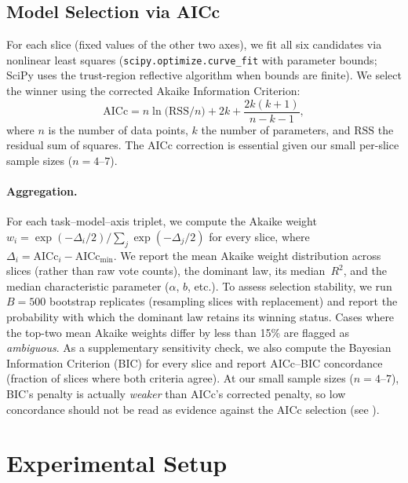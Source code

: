 \documentclass[11pt]{article}
\begin{document}
\subsection{Model Selection via AICc}

For each slice (fixed values of the other two axes), we fit all six
candidates via nonlinear least squares
(\texttt{scipy.optimize.curve\_fit} with parameter bounds;
SciPy uses the trust-region reflective algorithm when bounds are
finite). We select
the winner using the corrected Akaike Information Criterion:
\begin{equation}
  \mathrm{AICc} = n \ln\!\bigl(\mathrm{RSS}/n\bigr) + 2k +
  \frac{2k(k+1)}{n - k - 1},
\end{equation}
where $n$ is the number of data points, $k$ the number of parameters,
and $\mathrm{RSS}$ the residual sum of squares. The AICc correction
is essential given our small per-slice sample sizes ($n = 4$--$7$).

\paragraph{Aggregation.}
For each task--model--axis triplet, we compute the Akaike weight
$w_i = \exp(-\Delta_i/2)\big/\sum_j\exp(-\Delta_j/2)$
for every slice, where $\Delta_i = \mathrm{AICc}_i - \mathrm{AICc}_{\min}$.
We report the mean Akaike weight distribution across slices (rather
than raw vote counts), the dominant law, its median~$R^2$, and the
median characteristic parameter ($\alpha$, $b$, etc.).
To assess selection stability, we run $B=500$ bootstrap replicates
(resampling slices with replacement) and report the probability with
which the dominant law retains its winning status.
Cases where the top-two mean Akaike weights differ by less than 15\%
are flagged as \emph{ambiguous}.
As a supplementary sensitivity check, we also compute the Bayesian
Information Criterion (BIC) for every slice and report AICc--BIC
concordance (fraction of slices where both criteria agree).
At our small sample sizes ($n = 4$--$7$), BIC's penalty is actually
\emph{weaker} than AICc's corrected penalty, so low concordance
should not be read as evidence against the AICc selection
(see ).


\section{Experimental Setup}
\label{sec:experiments}
\end{document}
